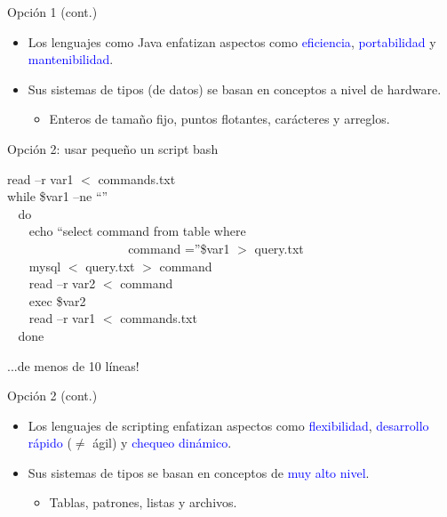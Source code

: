\documentclass[handout]{beamer} %
\newcommand{\blue}[1]{\textcolor{blue}{#1}}
\begin{document}
\begin{frame}{Opción 1 (cont.)}
  \begin{itemize}
    \item Los lenguajes como Java enfatizan aspectos como \blue{eficiencia}, \blue{portabilidad} y \blue{mantenibilidad}.
    \item Sus sistemas de tipos (de datos) se basan en conceptos a nivel de hardware.
    \begin{itemize}
        \item Enteros de tamaño fijo, puntos flotantes, carácteres y arreglos.
    \end{itemize}
  \end{itemize}
\end{frame}

\begin{frame}{Opción 2: usar pequeño un script bash}

  {\small
  read –r  var1 $<$ commands.txt\\
  while \$var1 –ne ``''\\
  $~~~~$do\\
  $~~~~~~~~$echo ``select command from table where\\
  $~~~~~~~~~~~~~~~~~~~~~~~~~~~~~~~~~~~~~~~~~~~~$command =''\$var1 $>$ query.txt\\
  $~~~~~~~~$mysql $<$ query.txt $>$ command\\
  $~~~~~~~~$read –r var2 $<$ command\\
  $~~~~~~~~$exec \$var2\\
  $~~~~~~~~$read –r var1 $<$ commands.txt\\
  $~~~~$done}
  \vspace{4ex}
  
  \begin{flushright}
    ...de menos de 10 líneas!
  \end{flushright}
\end{frame}

\begin{frame}{Opción 2 (cont.)}
  \begin{itemize}
    \item Los lenguajes de scripting enfatizan aspectos como \blue{flexibilidad}, \blue{desarrollo rápido} ($\neq$ ágil) y \blue{chequeo dinámico}.
    \item Sus sistemas de tipos se basan en conceptos de \blue{muy alto nivel}.
    \begin{itemize}
        \item Tablas, patrones, listas y archivos.
    \end{itemize}
  \end{itemize}
\end{frame}
\end{document}
